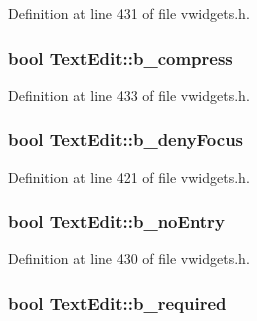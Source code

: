 Definition at line 431 of file vwidgets.h.

\hypertarget{classTextEdit_a962a32193892a1cb6dab10bd900529cd}{
\subsubsection[{b\_\-compress}]{\setlength{\rightskip}{0pt plus 5cm}bool {\bf TextEdit::b\_\-compress}}}
\label{classTextEdit_a962a32193892a1cb6dab10bd900529cd}


Definition at line 433 of file vwidgets.h.

\hypertarget{classTextEdit_ac45b8118dfcc4bfbda9e0d3fd52898f7}{
\subsubsection[{b\_\-denyFocus}]{\setlength{\rightskip}{0pt plus 5cm}bool {\bf TextEdit::b\_\-denyFocus}}}
\label{classTextEdit_ac45b8118dfcc4bfbda9e0d3fd52898f7}


Definition at line 421 of file vwidgets.h.

\hypertarget{classTextEdit_a59abaed4035aa13063c54d69c00fa2d1}{
\subsubsection[{b\_\-noEntry}]{\setlength{\rightskip}{0pt plus 5cm}bool {\bf TextEdit::b\_\-noEntry}}}
\label{classTextEdit_a59abaed4035aa13063c54d69c00fa2d1}


Definition at line 430 of file vwidgets.h.

\hypertarget{classTextEdit_a2ff74c95ba12d44c48617eeee9b91af7}{
\subsubsection[{b\_\-required}]{\setlength{\rightskip}{0pt plus 5cm}bool {\bf TextEdit::b\_\-required}}}
\label{classTextEdit_a2ff74c95ba12d44c48617eeee9b91af7}



